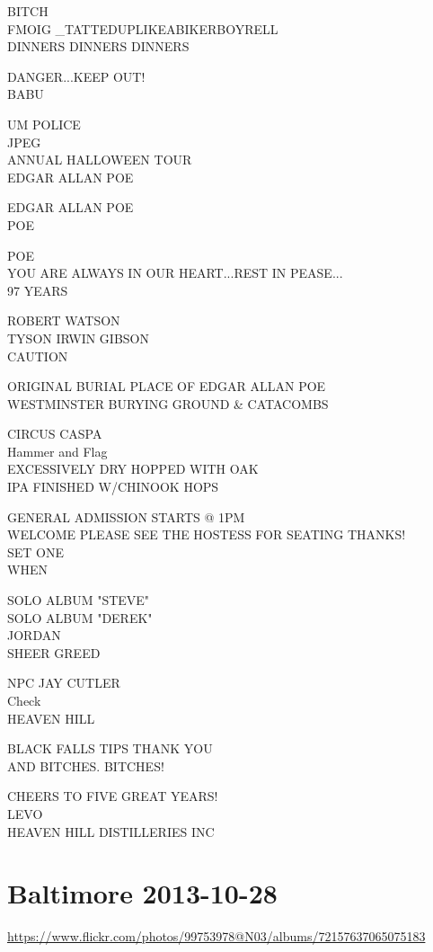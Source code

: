 \documentclass[10pt,letterpaper]{article}
\begin{document}
BITCH\\
FMOIG \_TATTEDUPLIKEABIKERBOYRELL\\
DINNERS DINNERS DINNERS

DANGER...KEEP OUT!\\
BABU

UM POLICE\\
JPEG\\
ANNUAL HALLOWEEN TOUR\\
EDGAR ALLAN POE

EDGAR ALLAN POE\\
POE

POE\\
YOU ARE ALWAYS IN OUR HEART...REST IN PEASE...\\
97 YEARS

ROBERT WATSON\\
TYSON IRWIN GIBSON\\
CAUTION

ORIGINAL BURIAL PLACE OF EDGAR ALLAN POE\\
WESTMINSTER BURYING GROUND \& CATACOMBS

CIRCUS CASPA\\
Hammer and Flag\\
EXCESSIVELY DRY HOPPED WITH OAK\\
IPA FINISHED W/CHINOOK HOPS

GENERAL ADMISSION STARTS @ 1PM\\
WELCOME PLEASE SEE THE HOSTESS FOR SEATING THANKS!\\
SET ONE\\
WHEN

SOLO ALBUM "STEVE"\\
SOLO ALBUM "DEREK"\\
JORDAN\\
SHEER GREED

NPC JAY CUTLER\\
Check\\
HEAVEN HILL

BLACK FALLS TIPS THANK YOU\\
AND BITCHES.  BITCHES!

CHEERS TO FIVE GREAT YEARS!\\
LEVO\\
HEAVEN HILL DISTILLERIES INC
\

\section*{Baltimore 2013-10-28}

\url{https://www.flickr.com/photos/99753978@N03/albums/72157637065075183}
\end{document}
